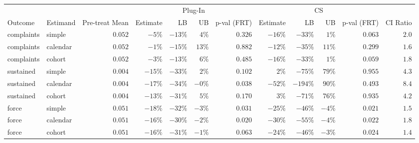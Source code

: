 \begin{longtable}{llrrrrrrrrrr}
\toprule
 &  &  & \multicolumn{4}{c}{Plug-In} & \multicolumn{4}{c}{CS} &  \\ 
\cmidrule(lr){4-7} \cmidrule(lr){8-11}
Outcome & Estimand & Pre-treat Mean & Estimate & LB & UB & p-val (FRT) & Estimate & LB & UB & p-val (FRT) & CI Ratio \\ 
\midrule
complaints & simple & $0.052$ & $-5\%$ & $-13\%$ & $4\%$ & $0.326$ & $-16\%$ & $-33\%$ & $1\%$ & $0.063$ & $2.0$ \\ 
complaints & calendar & $0.052$ & $-1\%$ & $-15\%$ & $13\%$ & $0.882$ & $-12\%$ & $-35\%$ & $11\%$ & $0.299$ & $1.6$ \\ 
complaints & cohort & $0.052$ & $-3\%$ & $-13\%$ & $6\%$ & $0.485$ & $-16\%$ & $-33\%$ & $1\%$ & $0.059$ & $1.8$ \\ 
sustained & simple & $0.004$ & $-15\%$ & $-33\%$ & $2\%$ & $0.102$ & $2\%$ & $-75\%$ & $79\%$ & $0.955$ & $4.3$ \\ 
sustained & calendar & $0.004$ & $-17\%$ & $-34\%$ & $-0\%$ & $0.038$ & $-52\%$ & $-194\%$ & $90\%$ & $0.493$ & $8.4$ \\ 
sustained & cohort & $0.004$ & $-13\%$ & $-31\%$ & $5\%$ & $0.170$ & $3\%$ & $-71\%$ & $76\%$ & $0.935$ & $4.2$ \\ 
force & simple & $0.051$ & $-18\%$ & $-32\%$ & $-3\%$ & $0.031$ & $-25\%$ & $-46\%$ & $-4\%$ & $0.021$ & $1.5$ \\ 
force & calendar & $0.051$ & $-16\%$ & $-30\%$ & $-2\%$ & $0.020$ & $-30\%$ & $-55\%$ & $-4\%$ & $0.022$ & $1.8$ \\ 
force & cohort & $0.051$ & $-16\%$ & $-31\%$ & $-1\%$ & $0.063$ & $-24\%$ & $-46\%$ & $-3\%$ & $0.024$ & $1.4$ \\ 
\bottomrule
\end{longtable}

